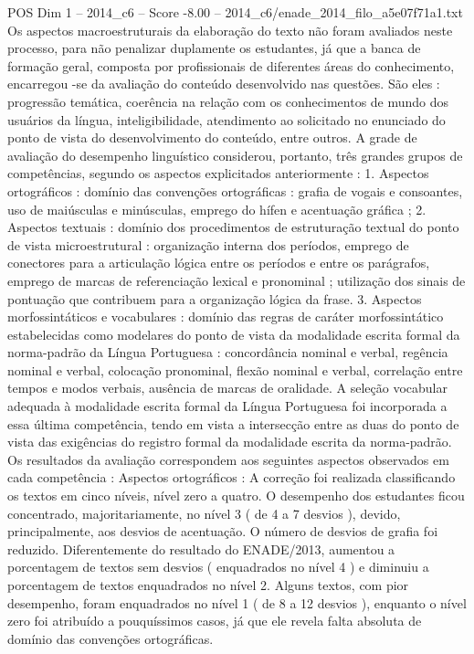 \begin{textsample}{POS Dim 1 – 2014\_c6 – Score -8.00 – 2014\_c6/enade\_2014\_filo\_a5e07f71a1.txt}
Os aspectos macroestruturais da elaboração do texto não foram avaliados neste processo, para não penalizar duplamente os estudantes, já que a banca de formação geral, composta por profissionais de diferentes áreas do conhecimento, encarregou -se da avaliação do conteúdo desenvolvido nas questões.
São eles : progressão temática, coerência na relação com os conhecimentos de mundo dos usuários da língua, inteligibilidade, atendimento ao solicitado no enunciado do ponto de vista do desenvolvimento do conteúdo, entre outros.
A grade de avaliação do desempenho linguístico considerou, portanto, três grandes grupos de competências, segundo os aspectos explicitados anteriormente : 1.
Aspectos ortográficos : domínio das convenções ortográficas : grafia de vogais e consoantes, uso de maiúsculas e minúsculas, emprego do hífen e acentuação gráfica ; 2.
Aspectos textuais : domínio dos procedimentos de estruturação textual do ponto de vista microestrutural : organização interna dos períodos, emprego de conectores para a articulação lógica entre os períodos e entre os parágrafos, emprego de marcas de referenciação lexical e pronominal ; utilização dos sinais de pontuação que contribuem para a organização lógica da frase. 3.
Aspectos morfossintáticos e vocabulares : domínio das regras de caráter morfossintático estabelecidas como modelares do ponto de vista da modalidade escrita formal da norma-padrão da Língua Portuguesa : concordância nominal e verbal, regência nominal e verbal, colocação pronominal, flexão nominal e verbal, correlação entre tempos e modos verbais, ausência de marcas de oralidade.
A seleção vocabular adequada à modalidade escrita formal da Língua Portuguesa foi incorporada a essa última competência, tendo em vista a intersecção entre as duas do ponto de vista das exigências do registro formal da modalidade escrita da norma-padrão.
Os resultados da avaliação correspondem aos seguintes aspectos observados em cada competência : Aspectos ortográficos : A correção foi realizada classificando os textos em cinco níveis, nível zero a quatro.
O desempenho dos estudantes ficou concentrado, majoritariamente, no nível 3 ( de 4 a 7 desvios ), devido, principalmente, aos desvios de acentuação.
O número de desvios de grafia foi reduzido.
Diferentemente do resultado do ENADE/2013, aumentou a porcentagem de textos sem desvios ( enquadrados no nível 4 ) e diminuiu a porcentagem de textos enquadrados no nível 2.
Alguns textos, com pior desempenho, foram enquadrados no nível 1 ( de 8 a 12 desvios ), enquanto o nível zero foi atribuído a pouquíssimos casos, já que ele revela falta absoluta de domínio das convenções ortográficas.

\end{textsample}
